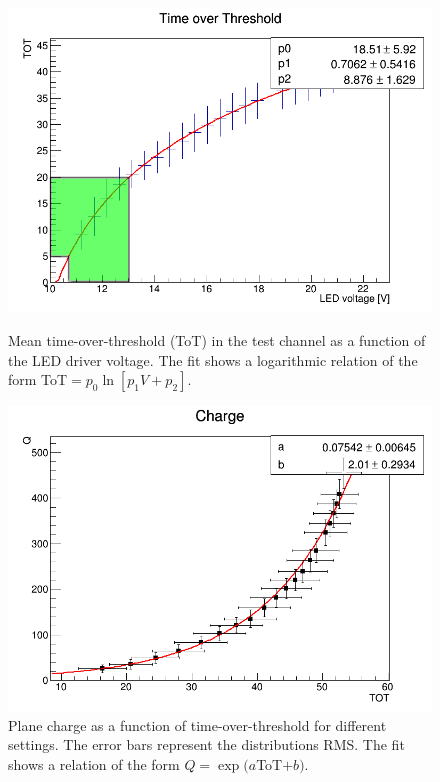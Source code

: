 \documentclass[a4paper,11pt]{article}
\begin{document}
\begin{figure}[htr!]
  \begin{minipage}[b]{.48\textwidth}
   \centering
   \includegraphics[width=\textwidth]{settings.png}
   \caption{Mean time-over-threshold (ToT) in the test channel as a function of the LED driver voltage. The fit shows a logarithmic relation of the form
   ToT$=p_0\ln\left[p_1V+p_2\right]$.}
   \label{fig:voltage}
  \end{minipage}
  \hfill
  \begin{minipage}[b]{.48\textwidth}
   \centering
   \includegraphics[width=\textwidth]{qvstot.png}
   \caption{Plane charge as a function of time-over-threshold for different settings. The error bars represent the distributions RMS. The fit shows a
   relation of the form $Q=\exp(a$ToT$+b)$.}
   \label{fig:charge_tot}
   \end{minipage}
\end{figure}
\end{document}
